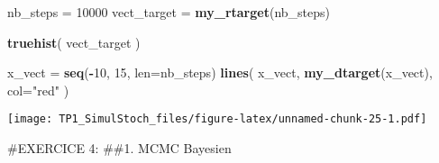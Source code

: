 \documentclass[]{article}
\newenvironment{Shaded}{\begin{snugshade}}{\end{snugshade}}
\newcommand{\DataTypeTok}[1]{\textcolor[rgb]{0.13,0.29,0.53}{#1}}
\newcommand{\DecValTok}[1]{\textcolor[rgb]{0.00,0.00,0.81}{#1}}
\newcommand{\KeywordTok}[1]{\textcolor[rgb]{0.13,0.29,0.53}{\textbf{#1}}}
\newcommand{\NormalTok}[1]{#1}
\newcommand{\OperatorTok}[1]{\textcolor[rgb]{0.81,0.36,0.00}{\textbf{#1}}}
\newcommand{\StringTok}[1]{\textcolor[rgb]{0.31,0.60,0.02}{#1}}
\begin{document}
\begin{Shaded}
\begin{Highlighting}[]
\NormalTok{nb_steps =}\StringTok{ }\DecValTok{10000}
\NormalTok{vect_target =}\StringTok{ }\KeywordTok{my_rtarget}\NormalTok{(nb_steps)}

\KeywordTok{truehist}\NormalTok{( vect_target )}

\NormalTok{x_vect =}\StringTok{ }\KeywordTok{seq}\NormalTok{(}\OperatorTok{-}\DecValTok{10}\NormalTok{, }\DecValTok{15}\NormalTok{, }\DataTypeTok{len=}\NormalTok{nb_steps)}
\KeywordTok{lines}\NormalTok{( x_vect, }\KeywordTok{my_dtarget}\NormalTok{(x_vect), }\DataTypeTok{col=}\StringTok{"red"}\NormalTok{ )}
\end{Highlighting}
\end{Shaded}

\texttt{[image: TP1\_SimulStoch\_files/figure-latex/unnamed-chunk-25-1.pdf]}

\#EXERCICE 4: \#\#1. MCMC Bayesien
\end{document}
